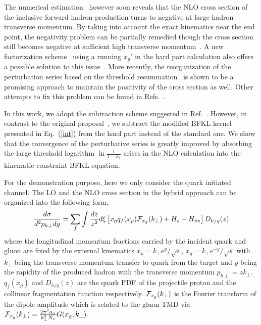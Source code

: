 \documentclass[prd,aps,preprint,tightenlines,nofootinbib,superscriptaddress]{revtex4}
\begin{document}
The numerical estimation~\cite{Stasto:2013cha}  however soon reveals that the NLO cross section of the inclusive forward  hadron production turns to negative at large  hadron transverse momentum.   
By taking into account the exact kinematics near the end point, the negativity problem can be partially remedied though the cross section still becomes negative at sufficient high transverse momentum~\cite{Watanabe:2015tja}.   A new factorization scheme~\cite{Iancu:2016vyg} using a running $x_g'$ in the hard part calculation also  offers a possible solution to this issue~\cite{Ducloue:2017mpb,Ducloue:2018lil}.  More recently, the reorganization of the perturbation series  based on the threshold resummation~\cite{Xiao:2018zxf,Liu:2020mpy,Shi:2021hwx} is shown to be a promising approach to maintain the positivity of the cross section as well.  Other attempts to fix this problem can be found in Refs.~\cite{Stasto:2014sea,Altinoluk:2014eka,Kang:2014lha,Ducloue:2016shw,Xiao:2014uba}. 

In this work, we adopt the subtraction scheme suggested in Ref.~\cite{Iancu:2016vyg}. However, in contrast to the original proposal~\cite{Iancu:2016vyg}, we subtract the modified BFKL kernel presented in Eq.~(\ref{int}) from the hard part instead of the standard one.   We show that the convergence of the perturbative series is greatly improved by absorbing the large threshold logarithm $\ln \frac{1}{1-x_p}$ arises in the NLO calculation  into the  kinematic constraint BFKL equation. 


 For the demonstration purpose, here we only consider the quark initiated channel. The LO and the NLO cross section in the hybrid approach can be organized into the following form,
\begin{eqnarray}
\frac{d\sigma}{d^2p_{h\perp} dy}=\sum_f \int \frac{dz}{z^2} d \xi \left [  x_p q_f(x_p){\cal F}_{x_g}(k_\perp)   + H_s  +H_{ns} \right ]  D_{h/q}(z) 
\label{cs}
\end{eqnarray}
where the longitudinal momentum fractions carried by the incident quark and gluon are fixed by the external kinematics $x_p=k_\perp e^y/\sqrt s$, $x_g=k_\perp e^{-y}/\sqrt s$ with  $k_\perp$ being the transverse momentum transfer to quark from the target and $y$ being the rapidity of the produced hadron with the transverse momentum $p_{h\perp}=zk_\perp$. $q_f(x_p)$ and $D_{h/q}(z) $ are the quark PDF of the projectile proton and the collinear fragmentation function respectively. ${\cal F}_{x_g}(k_\perp)$ is the Fourier transform of the dipole amplitude which is related to the gluon TMD  via ${\cal F}_{x_g}(k_\perp)= \frac{2\pi^2 \alpha_s }{k_\perp^2N_c}G(x_g,k_\perp)$.  
\end{document}
